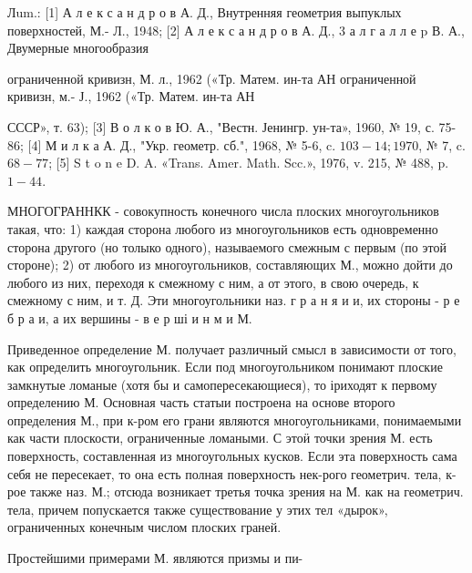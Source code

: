 \documentclass[10pt]{article}
\begin{document}
Лum.: [1] А л е к с а н д р о в А. Д., Внутренняя геометрия выпуклых поверхностей, М.- Л., 1948; [2] А л е к с а н д р о в А. Д., 3 а л г а л л е p В. А., Двумерные многообразия

ограниченной кривизн, М. л., 1962 («Тр. Матем. ин-та АН ограниченной кривизн, м.- Ј., 1962 («Тр. Матем. ин-та АН

СССР», т. 63); [3] В о л к о в Ю. А., "Вестн. Јенингр. ун-та», 1960, № 19, с. 75-86; [4] М и л к а А. Д., "Укр. геометр. сб.", 1968, № 5-6, c. $103-14 ; 1970$, № 7, c. $68-77$; [5] S t o n e D. A. «Trans. Amer. Math. Scc.», 1976, v. 215, № 488, p. $1-44$.



МНОГОГРАННКК - совокупность конечного числа плоских многоугольников такая, что: 1) каждая сторона любого из многоугольников есть одновременно сторона другого (но толыко одного), называемого смежным с первым (по этой стороне); 2) от любого из многоугольников, составляющих М., можно дойти до любого из них, переходя к смежному с ним, а от этого, в свою очередь, к смежному с ним, и т. Д. Эти многоугольники наз. г р а н я и и, их стороны - р е б р а и, а их вершины - в е р ші и н м и М.



Приведенное определение М. получает различный смысл в зависимости от того, как определить многоугольник. Если под многоугольником понимают плоские замкнутые ломаные (хотя бы и самопересекающиеся), то іриходят к первому определению М. Основная часть статыи построена на основе второго определения М., при к-ром его грани являются многоугольниками, понимаемыми как части плоскости, ограниченные ломаными. С этоӥ точки зрения М. есть поверхность, составленная из многоугольных кусков. Если эта поверхность сама себя не пересекает, то она есть полная поверхность нек-рого геометрич. тела, к-рое также наз. М.; отсюда возникает третья точка зрения на М. как на геометрич. тела, причем попускается также существование у этих тел «дырок», ограниченных конечным числом плоских граней.



Простейшими примерами М. являются призмы и пи-
\end{document}
